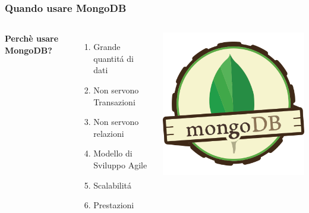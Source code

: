 \documentclass{beamer}
\begin{document}
\begin{frame}
\frametitle{Quando usare MongoDB}
\begin{columns}[c] %

\textbf{Perchè usare MongoDB?}
\begin{enumerate}
\item Grande quantit\'a di dati
\item Non servono Transazioni
\item Non servono relazioni
\item Modello di Sviluppo Agile
\item Scalabilit\'a
\item Prestazioni
\end{enumerate}

\includegraphics[width=1.2\linewidth]{mongodb.png}

\end{columns}
\end{frame}


\end{document}
